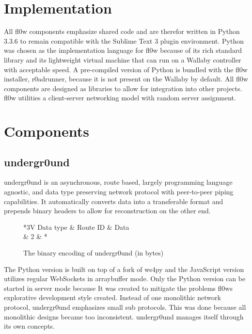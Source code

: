 \documentclass[conference]{IEEEtran}
\begin{document}
\section{Implementation}
All fl0w components emphasize shared code and are therefor written in Python 3.3.6\cite{Python 3.3.6:Python Foundation} to remain compatible with the Sublime Text 3\cite{Sublime Text 3:Sublime HQ} plugin environment. Python was chosen as the implementation language for fl0w because of its rich standard library and its lightweight virtual machine that can run on a Wallaby controller with acceptable speed. A pre-compiled version of Python \cite{Python 3.3.6:Python Foundation} is bundled with the fl0w installer, r0adrunner, because it is not present on the Wallaby by default. All fl0w components are designed as libraries to allow for integration into other projects. fl0w utilities a client-server networking model with random server assignment.

\section{Components}

\subsection{undergr0und}
undergr0und\cite{undergr0und:Philip Trauner} is an asynchronous, route based, largely programming language agnostic, and data type preserving network protocol with peer-to-peer piping capabilities.
It automatically converts data into a transferable format and prepends binary headers to allow for reconstruction on the other end.

\begin{figure}[H]
\centering
	\begin{tabular}{*{3}{V}}
		Data type & Route ID & Data \\  & 2 & * \\
	\end{tabular}
	\caption{The binary encoding of undergr0und (in bytes)}
\label{fig:undergr0und_header}
\end{figure}


The Python\cite{Python 3.3.6:Python Foundation} version is built on top of a fork of ws4py\cite{ws4py:Philip Trauner} and the JavaScript version utilizes regular WebSockets\cite{The WebSocket Protocol:A. Melnikov} in arraybuffer mode. Only the Python version can be started in server mode because It was created to mitigate the problems fl0ws explorative development style created. Instead of one monolithic network protocol, undergr0und emphasizes small sub protocols. This was done because all monolithic designs became too inconsistent. undergr0und\cite{undergr0und:Philip Trauner} manages itself through its own concepts.
\end{document}
